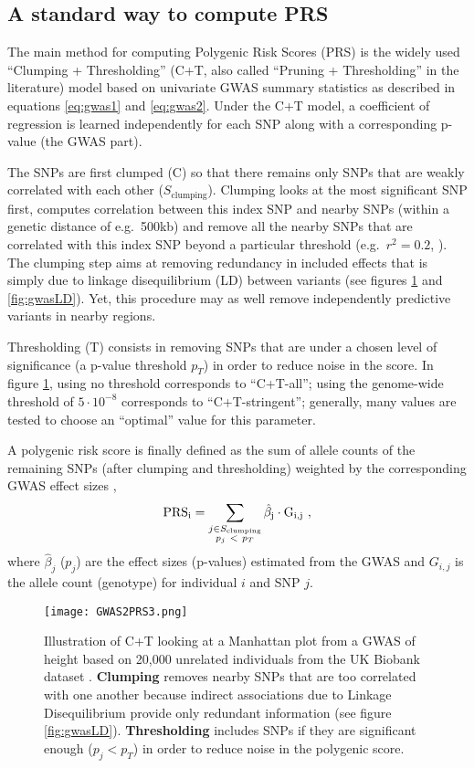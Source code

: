 \subsection{A standard way to compute PRS}\label{sec:C+T}

The main method for computing Polygenic Risk Scores (PRS) is the widely used ``Clumping + Thresholding'' (C+T, also called ``Pruning + Thresholding'' in the literature) model based on univariate GWAS summary statistics as described in equations \eqref{eq:gwas1} and \eqref{eq:gwas2}.
Under the C+T model, a coefficient of regression is learned independently for each SNP along with a corresponding p-value (the GWAS part). 

The SNPs are first clumped (C) so that there remains only SNPs that are weakly correlated with each other ($S_\text{clumping}$). Clumping looks at the most significant SNP first, computes correlation between this index SNP and nearby SNPs (within a genetic distance of e.g.\ 500kb) and remove all the nearby SNPs that are correlated with this index SNP beyond a particular threshold (e.g.\ $r^2 = 0.2$, \cite{wray2014research}). 
The clumping step aims at removing redundancy in included effects that is simply due to linkage disequilibrium (LD) between variants (see figures \ref{fig:gwas2} and \ref{fig:gwasLD}). Yet, this procedure may as well remove independently predictive variants in nearby regions.

Thresholding (T) consists in removing SNPs that are under a chosen level of significance (a p-value threshold $p_T$) in order to reduce noise in the score.
In figure \ref{fig:gwas2}, using no threshold corresponds to ``C+T-all''; using the genome-wide threshold of $5 \cdot 10^{-8}$ corresponds to ``C+T-stringent''; generally, many values are tested to choose an ``optimal'' value for this parameter. 

A polygenic risk score is finally defined as the sum of allele counts of the remaining SNPs (after clumping and thresholding) weighted by the corresponding GWAS effect sizes \cite[]{purcell2009common,Dudbridge2013,wray2014research,Euesden2015},
\[\rm{PRS}_i = \sum_{\substack{j \in S_\text{clumping} \\ p_j~<~p_T}} \hat\beta_j \cdot G_{i,j}~,\] where $\hat\beta_j$ ($p_j$) are the effect sizes (p-values) estimated from the GWAS and $G_{i,j}$ is the allele count (genotype) for individual $i$ and SNP $j$.

\begin{figure}[htb]
\centerline{\texttt{[image: GWAS2PRS3.png]}}
\caption{Illustration of C+T looking at a Manhattan plot from a GWAS of height based on 20,000 unrelated individuals from the UK Biobank dataset \cite[]{bycroft2017genome}. \textbf{\color{clumping}Clumping} removes nearby SNPs that are too correlated with one another because indirect associations due to Linkage Disequilibrium provide only redundant information (see figure \ref{fig:gwasLD}). \textbf{\color{thresholding}Thresholding} includes SNPs if they are significant enough ($p_j < p_T$) in order to reduce noise in the polygenic score.}\label{fig:gwas2}
\end{figure}

